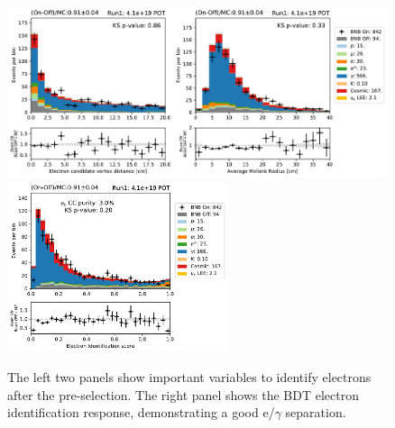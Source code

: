 \begin{figure}[h]
    \centering
    \includegraphics[height=5cm]{NueCCsel/Images/run1/e_cand_dist.pdf}
    \includegraphics[height=5cm]{NueCCsel/Images/run1/pre_e_score.pdf}
    \caption{The left two panels show important variables to identify electrons after the pre-selection. The right panel shows the BDT electron identification response, demonstrating a good e/$\gamma$ separation.}
    \label{fig:e_cand_dist}
\end{figure}



